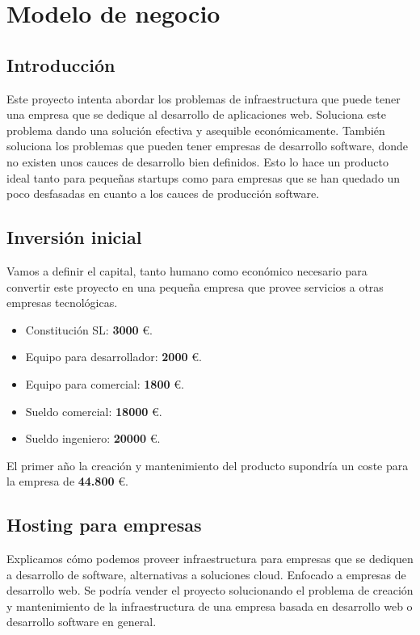 \chapter {Modelo de negocio}

\section{Introducción}
        \begin{text}
                Este proyecto intenta abordar los problemas de infraestructura que puede tener una empresa que se dedique al desarrollo de aplicaciones web. Soluciona este problema dando una solución efectiva y asequible económicamente. También soluciona los problemas que pueden tener empresas de desarrollo software, donde no existen unos cauces de desarrollo bien definidos. Esto lo hace un producto ideal tanto para pequeñas startups como para empresas que se han quedado un poco desfasadas en cuanto a los cauces de producción software.
        \end{text}

\section{Inversión inicial}
        \begin{text}
                Vamos a definir el capital, tanto humano como económico necesario para convertir este proyecto en una pequeña empresa que provee servicios a otras empresas tecnológicas.

                \begin{itemize}
                        \item Constitución SL: \textbf{3000} \euro.
                        \item Equipo para desarrollador: \textbf{2000} \euro.
                        \item Equipo para comercial: \textbf{1800} \euro.
                        \item Sueldo comercial: \textbf{18000} \euro.
                        \item Sueldo ingeniero: \textbf{20000} \euro.
                \end{itemize}

                El primer año la creación y mantenimiento del producto supondría un coste para la empresa de \textbf{44.800} \euro.
        \end{text}

\section{Hosting para empresas}
        \begin{text}
                Explicamos cómo podemos proveer infraestructura para empresas que se dediquen a desarrollo de software, alternativas a soluciones cloud.
                Enfocado a empresas de desarrollo web. Se podría vender el proyecto solucionando el problema de creación y mantenimiento de la infraestructura de una empresa basada en desarrollo web o desarrollo software en general.
        \end{text}

